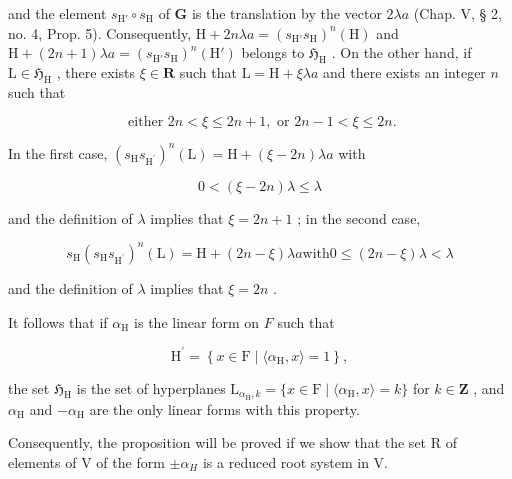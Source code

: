 and the element \(s_{\mathrm{H}'} \circ s_{\mathrm{H}}\) of \(\mathbf{G}\) is the translation by the vector \(2\lambda a\) (Chap. V, § 2, no. 4, Prop. 5). Consequently, \(\mathrm{H} + 2n\lambda a = (s_{\mathrm{H}'}s_{\mathrm{H}})^n(\mathrm{H})\) and \(\mathrm{H} + (2n + 1)\lambda a = (s_{\mathrm{H}'}s_{\mathrm{H}})^n(\mathrm{H}')\) belongs to \(\mathfrak{H}_{\mathrm{H}}\) . On the other hand, if \(\mathrm{L} \in \mathfrak{H}_{\mathrm{H}}\) , there exists \(\xi \in \mathbf{R}\) such that \(\mathrm{L} = \mathrm{H} + \xi \lambda a\) and there exists an integer \(n\) such that

\[
\text { either } 2 n <   \xi \leqslant 2 n + 1, \text { or } 2 n - 1 <   \xi \leqslant 2 n.
\]

In the first case, \((s_{\mathrm{H}}s_{\mathrm{H}^{\prime}})^{n}(\mathrm{L}) = \mathrm{H} + (\xi -2n)\lambda a\) with

\[
0 <   (\xi - 2 n) \lambda \leqslant \lambda
\]

and the definition of \(\lambda\) implies that \(\xi = 2n + 1\) ; in the second case,

\[
s _ {\mathrm{H}} (s _ {\mathrm{H}} s _ {\mathrm {H^ {\prime}}}) ^ {n} (\mathrm{L}) = \mathrm{H} + (2 n - \xi) \lambda a \text {with} 0 \leqslant (2 n - \xi) \lambda <   \lambda
\]

and the definition of \(\lambda\) implies that \(\xi = 2n\) .

It follows that if \(\alpha_{\mathrm{H}}\) is the linear form on \(F\) such that

\[
\mathrm{H} ^ {\prime} = \left\{x \in \mathrm{F} \mid \langle \alpha_ {\mathrm{H}}, x \rangle = 1 \right\},
\]

the set \(\mathfrak{H}_{\mathrm{H}}\) is the set of hyperplanes \(\mathrm{L}_{\alpha_{\mathrm{H}},k} = \{x\in \mathrm{F}\mid \langle \alpha_{\mathrm{H}},x\rangle = k\}\) for \(k\in \mathbf{Z}\) , and \(\alpha_{\mathrm{H}}\) and \(-\alpha_{\mathrm{H}}\) are the only linear forms with this property.

Consequently, the proposition will be proved if we show that the set R of elements of V of the form \(\pm\alpha_{H}\) is a reduced root system in V.


